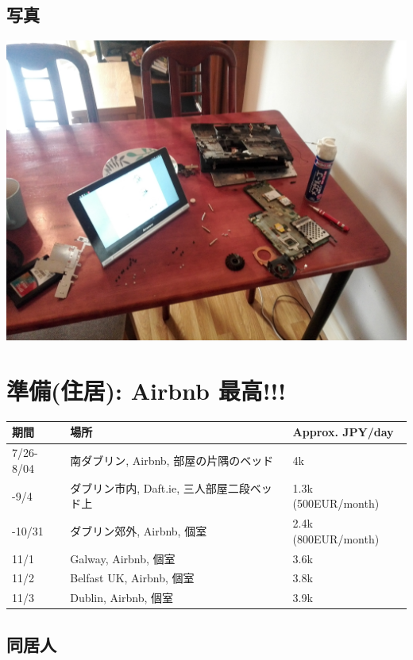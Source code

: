 \subsection{写真}
\label{sec-6-3}

\includegraphics{img/static/fix.jpg}

\section{準備(住居): Airbnb 最高!!!}
\label{sec-7}

\begin{center}
\begin{tabular}{lll}
期間 & 場所 & Approx. JPY/day\\
\hline
7/26-8/04 & 南ダブリン, Airbnb, 部屋の片隅のベッド & 4k\\
-9/4 & ダブリン市内, Daft.ie, 三人部屋二段ベッド上 & 1.3k (500EUR/month)\\
-10/31 & ダブリン郊外, Airbnb, 個室 & 2.4k (800EUR/month)\\
11/1 & Galway, Airbnb, 個室 & 3.6k\\
11/2 & Belfast UK, Airbnb, 個室 & 3.8k\\
11/3 & Dublin, Airbnb, 個室 & 3.9k\\
\end{tabular}
\end{center}

\subsection{同居人}
\label{sec-7-1}

